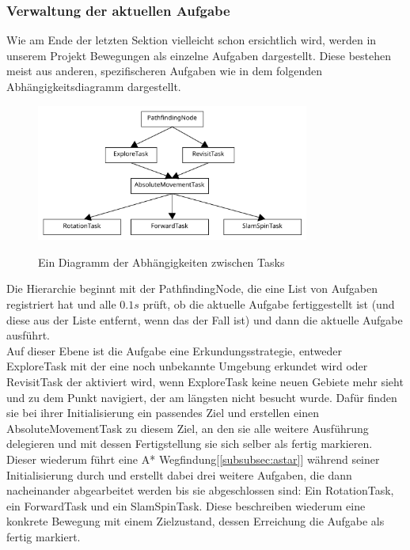 \subsubsection{Verwaltung der aktuellen Aufgabe} \label{subsubsec:taskmanagement}
Wie am Ende der letzten Sektion vielleicht schon ersichtlich wird, werden in unserem Projekt Bewegungen als einzelne
Aufgaben dargestellt.
Diese bestehen meist aus anderen, spezifischeren Aufgaben wie in dem folgenden Abhängigkeitsdiagramm dargestellt.
\begin{figure}[h]
    \caption{Ein Diagramm der Abhängigkeiten zwischen Tasks}
\includegraphics[width=0.8\textwidth]{img/TaskDiagram}\label{fig:taskdiagram}
\centering
\end{figure}
Die Hierarchie beginnt mit der PathfindingNode, die eine List von Aufgaben registriert hat und alle $0.1s$ prüft, ob die
aktuelle Aufgabe fertiggestellt ist (und diese aus der Liste entfernt, wenn das der Fall ist) und dann die aktuelle
Aufgabe ausführt.\\

Auf dieser Ebene ist die Aufgabe eine Erkundungsstrategie, entweder ExploreTask mit der eine noch unbekannte Umgebung
erkundet wird oder RevisitTask der aktiviert wird, wenn ExploreTask keine neuen Gebiete mehr sieht und zu dem Punkt
navigiert, der am längsten nicht besucht wurde.
Dafür finden sie bei ihrer Initialisierung ein passendes Ziel und erstellen einen AbsoluteMovementTask zu diesem Ziel,
an den sie alle weitere Ausführung delegieren und mit dessen Fertigstellung sie sich selber als fertig markieren.\\

Dieser wiederum führt eine A* Wegfindung[\ref{subsubsec:astar}] während seiner Initialisierung durch und erstellt dabei
drei weitere Aufgaben, die dann nacheinander abgearbeitet werden bis sie abgeschlossen sind: Ein RotationTask,
ein ForwardTask und ein SlamSpinTask.
Diese beschreiben wiederum eine konkrete Bewegung mit einem Zielzustand, dessen Erreichung die Aufgabe als fertig markiert.\\

